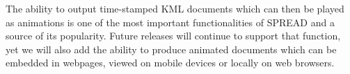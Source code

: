 The ability to output time-stamped KML documents which can then be played as animations is one of the most important functionalities of SPREAD and a source of its popularity.
Future releases will continue to support that function, yet we will also add the ability to produce animated documents which can be embedded in webpages, viewed on mobile devices or locally on web browsers.

